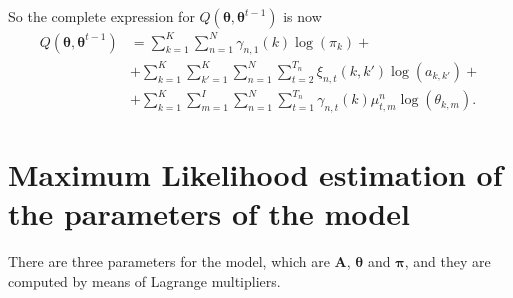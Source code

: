 \documentclass[12pt]{article}%
\newcommand{\bs}{\boldsymbol}
\begin{document}
So the complete expression for $Q \left( \boldsymbol { \theta } , \boldsymbol { \theta } ^ { t - 1 } \right)$ is now
\begin{equation}
\begin{split}
Q \left( \boldsymbol { \theta } , \boldsymbol { \theta } ^ { t - 1 } \right) &= \sum\limits_{k=1}^{K}\sum _ { n = 1 } ^ { N } \gamma _ { n , 1 } ( k ) \log(\pi_{k}) + \\
&+ \sum\limits_{k=1}^{K}\sum\limits_{k'=1}^{K}\sum _ { n = 1 } ^ { N } \sum _ { t = 2 } ^ { T _ { n } } \xi _ { n , t } ( k , k' ) \log(a_{k,k'}) + \\
&+ \sum\limits_{k=1}^{K}\sum\limits_{m=1}^{I}\sum _ { n = 1 } ^ { N } \sum _ { t = 1 } ^ { T _ { n } } \gamma _ { n , t } ( k )\mu^{n}_{t,m} \log(\theta_{k,m}).
\end{split}
\end{equation}
\section{Maximum Likelihood estimation of the parameters of the model}
There are three parameters for the model, which are $\mathbf{A}$, $\bs\theta$ and $\bs\pi$, and they are computed by means of Lagrange multipliers.
\end{document}
